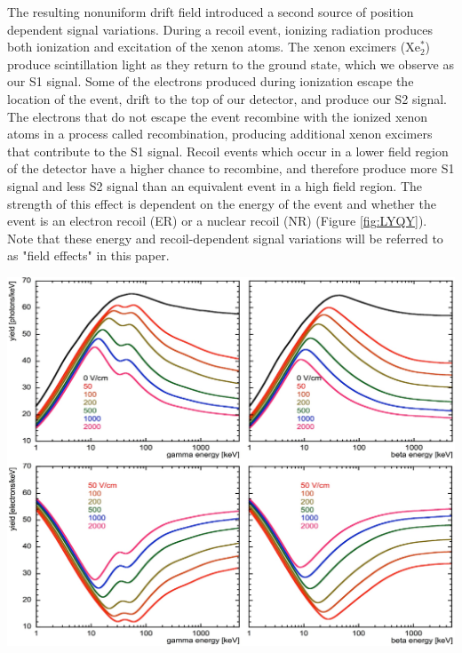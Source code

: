 The resulting nonuniform drift field introduced a second source of position dependent signal variations.  During a recoil event, ionizing radiation produces both ionization and excitation of the xenon atoms.  The xenon excimers (Xe$_2^*$) produce scintillation light as they return to the ground state, which we observe as our S1 signal. Some of the electrons produced during ionization escape the location of the event, drift to the top of our detector, and produce our S2 signal.  The electrons that do not escape the event recombine with the ionized xenon atoms in a process called recombination, producing additional xenon excimers that contribute to the S1 signal.  Recoil events which occur in a lower field region of the detector have a higher chance to recombine, and therefore produce more S1 signal and less S2 signal than an equivalent event in a high field region.  The strength of this effect is dependent on the energy of the event and whether the event is an electron recoil (ER) or a nuclear recoil (NR) (Figure \ref{fig:LYQY}).  Note that these energy and recoil-dependent signal variations will be referred to as "field effects" in this paper.  

\begin{center}
\includegraphics[scale=0.25]{figures/Fig1.png}
 \label{fig:LYQY}
\end{center}
